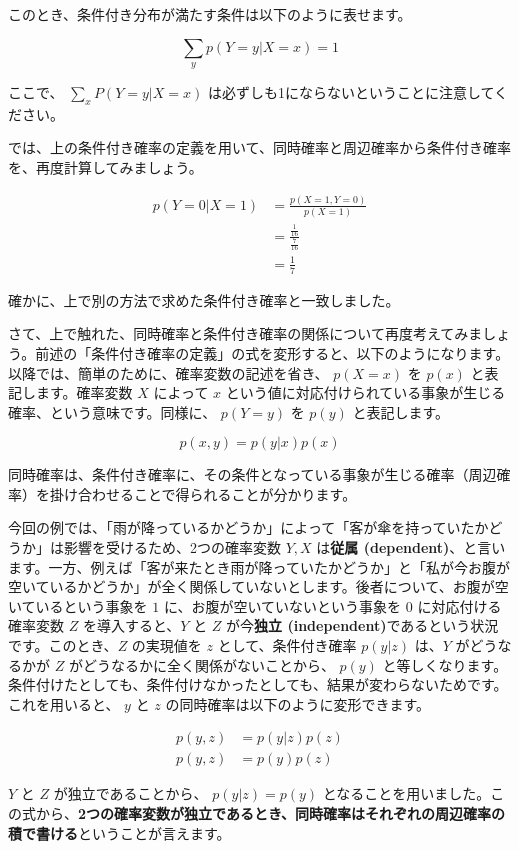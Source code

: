 このとき、条件付き分布が満たす条件は以下のように表せます。


\[
\sum_y p(Y = y | X = x) = 1
\]


ここで、 $\sum_x P(Y = y | X = x)$ は必ずしも1にならないということに注意してください。


では、上の条件付き確率の定義を用いて、同時確率と周辺確率から条件付き確率を、再度計算してみましょう。


\begin{align}
p(Y = 0 | X = 1)
&= \frac{p(X = 1, Y = 0)}{p(X = 1)} \\
&= \frac{\frac{1}{16}}{\frac{7}{16}} \\
&= \frac{1}{7}
\end{align}


確かに、上で別の方法で求めた条件付き確率と一致しました。


さて、上で触れた、同時確率と条件付き確率の関係について再度考えてみましょう。前述の「条件付き確率の定義」の式を変形すると、以下のようになります。以降では、簡単のために、確率変数の記述を省き、 $p(X = x)$ を $p(x)$ と表記します。確率変数 $X$ によって $x$ という値に対応付けられている事象が生じる確率、という意味です。同様に、 $p(Y = y)$ を $p(y)$ と表記します。


\[
p(x, y) = p(y | x) p(x)
\]


同時確率は、条件付き確率に、その条件となっている事象が生じる確率（周辺確率）を掛け合わせることで得られることが分かります。


今回の例では、「雨が降っているかどうか」によって「客が傘を持っていたかどうか」は影響を受けるため、2つの確率変数 $Y, X$ は\textbf{従属 (dependent)}、と言います。一方、例えば「客が来たとき雨が降っていたかどうか」と「私が今お腹が空いているかどうか」が全く関係していないとします。後者について、お腹が空いているという事象を $1$ に、お腹が空いていないという事象を $0$ に対応付ける確率変数 $Z$ を導入すると、$Y$ と $Z$ が今\textbf{独立 (independent)}であるという状況です。このとき、$Z$ の実現値を $z$ として、条件付き確率 $p(y | z)$ は、$Y$ がどうなるかが $Z$ がどうなるかに全く関係がないことから、 $p(y)$ と等しくなります。条件付けたとしても、条件付けなかったとしても、結果が変わらないためです。これを用いると、 $y$ と $z$ の同時確率は以下のように変形できます。


\begin{align}
p(y, z) &= p(y | z) p(z) \\
p(y, z) &= p(y) p(z)
\end{align}


 $Y$ と $Z$ が独立であることから、 $p(y | z) = p(y)$ となることを用いました。この式から、\textbf{2つの確率変数が独立であるとき、同時確率はそれぞれの周辺確率の積で書ける}ということが言えます。


